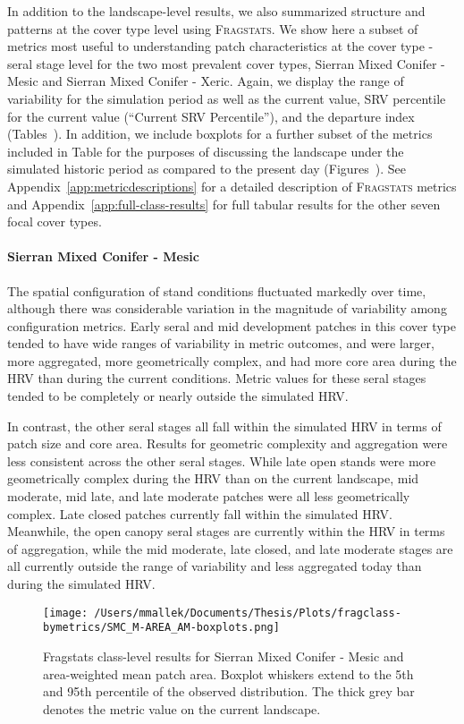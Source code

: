In addition to the landscape-level results, we also summarized structure and patterns at the cover type level using \textsc{Fragstats}. We show here a subset of metrics most useful to understanding patch characteristics at the cover type - seral stage level for the two most prevalent cover types, Sierran Mixed Conifer - Mesic and Sierran Mixed Conifer - Xeric. Again, we display the range of variability for the simulation period as well as the current value, SRV percentile for the current value (``Current SRV Percentile''), and the departure index (Tables~). In addition, we include boxplots for a further subset of the metrics included in Table for the purposes of discussing the landscape under the simulated historic period as compared to the present day (Figures~). See Appendix~\ref{app:metricdescriptions} for a detailed description of \textsc{Fragstats} metrics and Appendix~\ref{app:full-class-results} for full tabular results for the other seven focal cover types.


\paragraph{Sierran Mixed Conifer - Mesic} %
The spatial configuration of stand conditions fluctuated markedly over time, although there was considerable variation in the magnitude of variability among configuration metrics. Early seral and mid development patches in this cover type tended to have wide ranges of variability in metric outcomes, and were larger, more aggregated, more geometrically complex, and had more core area during the HRV than during the current conditions. Metric values for these seral stages tended to be completely or nearly outside the simulated HRV. 

In contrast, the other seral stages all fall within the simulated HRV in terms of patch size and core area. Results for geometric complexity and aggregation were less consistent across the other seral stages. While late open stands were more geometrically complex during the HRV than on the current landscape, mid moderate, mid late, and late moderate patches were all less geometrically complex. Late closed patches currently fall within the simulated HRV. Meanwhile, the open canopy seral stages are currently within the HRV in terms of aggregation, while the mid moderate, late closed, and late moderate stages are all currently outside the range of variability and less aggregated today than during the simulated HRV.  

\begin{figure}[!htbp]
\centering
    \texttt{[image: /Users/mmallek/Documents/Thesis/Plots/fragclass-bymetrics/SMC\_M-AREA\_AM-boxplots.png]}
  \caption{Fragstats class-level results for Sierran Mixed Conifer - Mesic and area-weighted mean patch area. Boxplot whiskers extend to the 5th and 95th percentile of the observed distribution. The thick grey bar denotes the metric value on the current landscape.}
  \label{fig:smcm_areaam}
\end{figure}


